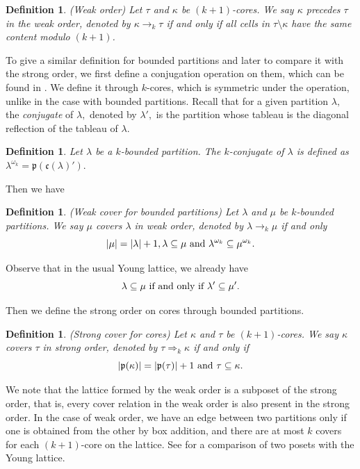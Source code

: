 \documentclass[11pt]{amsart}
\newtheorem{definition}[theorem]{Definition}
\newcommand{\tn}[1]{\textnormal{#1}}
\begin{document}
\begin{definition} \tn{(Weak order)} \label{weak order}
Let $\tau$ and $\kappa$ be $(k+1)$-cores. We say $\kappa$ precedes $\tau$ in the weak order, denoted by $\kappa \rightarrow_k \tau$ if and only if all cells in $\tau \setminus \kappa$ have the same content modulo $(k+1)$. 
\end{definition}


To give a similar definition for bounded partitions and later to compare it with the strong order, we first define a conjugation operation on them, which can be found in \cite{LM05}. We define it through $k$-cores, which is symmetric under the operation, unlike in the case with bounded partitions. Recall that for a given partition $\lambda,$  the \textit{conjugate} of $\lambda,$ denoted by $\lambda',$ is the partition whose tableau is the diagonal reflection of the tableau of $\lambda.$ 
\begin{definition} \label{conjugate}
Let $\lambda$ be a $k$-bounded partition. The \textit{$k$-conjugate} of $\lambda$ is defined as $\lambda^{\omega_k}=\mathfrak{p}(\mathfrak{c}(\lambda)').$ 
\end{definition}
Then we have
\begin{definition} \tn{(Weak cover for bounded partitions)}
Let $\lambda$ and $\mu$ be $k$-bounded partitions. We say $\mu$ covers $\lambda$ in weak order, denoted by $\lambda \rightarrow_k \mu$ if and only 
\[|\mu|=|\lambda|+1, \lambda \subseteq \mu \tn{ and }\lambda^{\omega_k} \subseteq \mu^{\omega_k}.\]
\end{definition}
Observe that in the usual Young lattice, we already have
\[\lambda \subseteq \mu \tn{ if and only if } \lambda' \subseteq \mu'.\]

Then we define the strong order on cores through bounded partitions.
\begin{definition} \tn{(Strong cover for cores)}
Let $\kappa$ and $\tau$ be $(k+1)$-cores. We say $\kappa$ covers $\tau$ in strong order, denoted by $\tau \Rightarrow_k \kappa$ if and only if 
\[|\mathfrak{p}(\kappa)|=|\mathfrak{p}(\tau)|+1 \tn{ and } \tau \subseteq \kappa.\]
\end{definition}

We note that the lattice formed by the weak order is a subposet of the strong order, that is, every cover relation in the weak order is also present in the strong order.
In the case of weak order, we have an edge between two partitions only if one is obtained from the other by box addition, and there are at most $k$ covers for each $(k+1)$-core on the lattice. See \cite{LLMSSZ14} for a comparison of two posets with the Young lattice.
 
\end{document}
